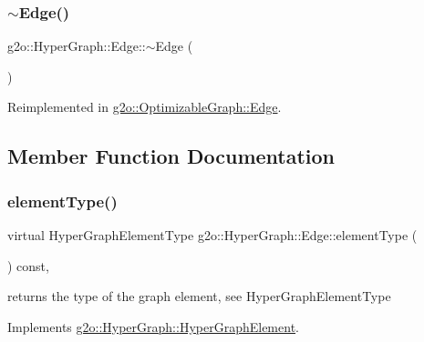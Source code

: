 \mbox{\label{classg2o_1_1_hyper_graph_1_1_edge_a202cb31558caef5a7bf18a49281173a3}} 
\subsubsection{\texorpdfstring{$\sim$\+Edge()}{~Edge()}}
{\footnotesize\ttfamily g2o\+::\+Hyper\+Graph\+::\+Edge\+::$\sim$\+Edge (\begin{DoxyParamCaption}{ }\end{DoxyParamCaption})\hspace{0.3cm}{\ttfamily [virtual]}}



Reimplemented in \mbox{\hyperlink{classg2o_1_1_optimizable_graph_1_1_edge_a62de61a43d47cf223fe39265dac13ca5}{g2o\+::\+Optimizable\+Graph\+::\+Edge}}.



\subsection{Member Function Documentation}
\mbox{\label{classg2o_1_1_hyper_graph_1_1_edge_a04f1b4d408aebdf14ac3f0cfd247b776}} 
\subsubsection{\texorpdfstring{element\+Type()}{elementType()}}
{\footnotesize\ttfamily virtual Hyper\+Graph\+Element\+Type g2o\+::\+Hyper\+Graph\+::\+Edge\+::element\+Type (\begin{DoxyParamCaption}{ }\end{DoxyParamCaption}) const\hspace{0.3cm}{\ttfamily [inline]}, {\ttfamily [virtual]}}

returns the type of the graph element, see Hyper\+Graph\+Element\+Type 

Implements \mbox{\hyperlink{structg2o_1_1_hyper_graph_1_1_hyper_graph_element_a1a9d7b748698c09d202373e06e413ef2}{g2o\+::\+Hyper\+Graph\+::\+Hyper\+Graph\+Element}}.

